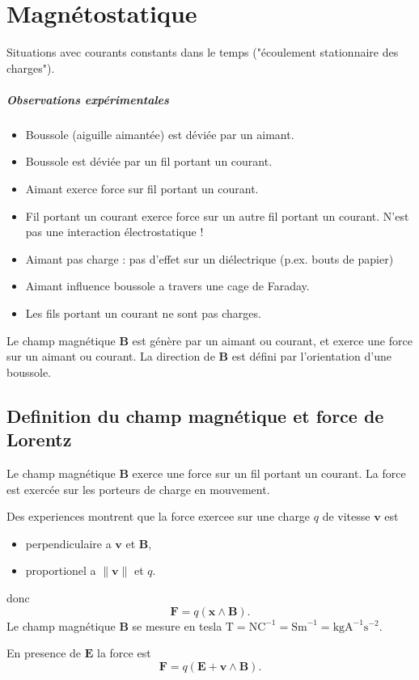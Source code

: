 \chapter{Magnétostatique}
Situations avec courants constants dans le temps ("écoulement stationnaire des charges").
\paragraph{Observations expérimentales}
\begin{itemize}
\item Boussole (aiguille aimantée) est déviée par un aimant.
\item Boussole est déviée par un fil portant un courant.
\item Aimant exerce force sur fil portant un courant.
\item Fil portant un courant exerce force sur un autre fil portant un courant. N'est pas une interaction électrostatique !
\item Aimant pas charge : pas d'effet sur un diélectrique (p.ex. bouts de papier)
\item Aimant influence boussole a travers une cage de Faraday.
\item Les fils portant un courant ne sont pas charges.
\end{itemize}

\begin{definition}
Le champ magnétique $\boldsymbol{B}$ est génère par un aimant ou courant, et exerce une force sur un aimant ou courant. La direction de $\boldsymbol{B}$ est défini par l'orientation d'une boussole.
\end{definition}
\section{Definition du champ magnétique et force de Lorentz}

Le champ magnétique $\boldsymbol{B}$ exerce une force sur un fil portant un courant. La force est exercée sur les porteurs de charge en mouvement.

Des experiences montrent que la force exercee sur une charge $q$ de vitesse $\boldsymbol{v}$ est
\begin{itemize}
\item perpendiculaire a $\boldsymbol{v}$ et $\boldsymbol{B}$,
\item proportionel a $\lVert \boldsymbol{v} \rVert$ et $q$.
\end{itemize}
donc 
$$
\boldsymbol{F}=q(\boldsymbol{x}\land \boldsymbol{B}).
$$
Le champ magnétique $\boldsymbol{B}$ se mesure en tesla $\mathrm{T}=\mathrm{NC}^{-1}=\mathrm{Sm}^{-1}=\mathrm{kgA}^{-1}\mathrm{s}^{-2}$.
\begin{definition}
En presence de $\boldsymbol{E}$ la force est
$$
\boldsymbol{F}=q(\boldsymbol{E}+\boldsymbol{v}\land \boldsymbol{B}).
$$
\end{definition}
